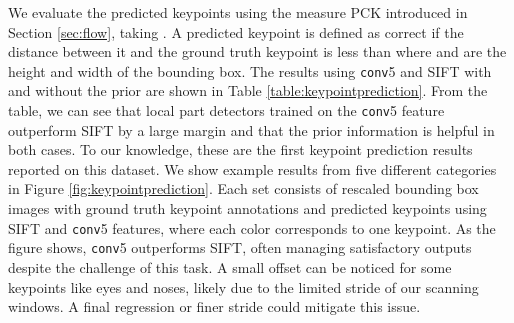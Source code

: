 \documentclass{article} \usepackage{nips14submit_e,times}
\begin{document}
We evaluate the predicted keypoints using the measure PCK introduced
in Section \ref{sec:flow}, taking . A predicted keypoint is defined as correct
if the distance between it and the ground truth keypoint is less than  where 
 and  are the height and width of the bounding box.
The results using \texttt{conv}5 and SIFT
with and without the prior are shown in Table \ref{table:keypointprediction}. From
the table, we can see that local part detectors trained on the \texttt{conv}5 feature
outperform SIFT by a large margin and that the prior information is helpful
in both cases.
To our knowledge, these are the first keypoint prediction results reported on this
dataset.
We
show example results from five different categories in Figure
\ref{fig:keypointprediction}. Each set consists of rescaled bounding box images
with ground truth keypoint annotations and predicted keypoints using SIFT and
\texttt{conv}5 features,  where each color corresponds to one keypoint. As the
figure
shows, \texttt{conv}5 outperforms SIFT,
often managing satisfactory outputs despite the challenge of this
task. A small offset can be noticed for some keypoints like eyes and noses, likely
due to the limited
stride of our scanning windows. A final regression or finer
stride could mitigate this issue.
\end{document}
